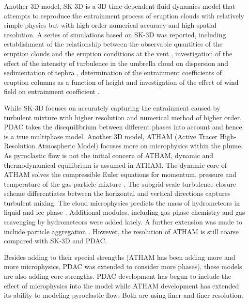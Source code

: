 \documentclass[journal abbreviation, manuscript]{copernicus}
\begin{document}
Another 3D model, SK-3D \citep{suzuki2005numerical} is a 3D time-dependent fluid dynamics model that attempts to reproduce the entrainment process of eruption clouds with relatively simple physics but with high order numerical accuracy and high spatial resolution.
A series of simulations based on SK-3D was reported, including establishment of the relationship between the observable quantities of the eruption clouds and the eruption conditions at the vent \citep{suzuki2009three}, investigation of the effect of the intensity of turbulence in the umbrella cloud on dispersion and sedimentation of tephra \citep{koyaguchi2009effect}, determination of the entrainment coefficients of eruption columns as a function of height \citep{suzuki2010numerical} and investigation of the effect of wind field on entrainment coefficient \citep{suzuki20133d}. 

While SK-3D focuses on accurately capturing the entrainment caused by turbulent mixture with higher resolution and numerical method of higher order, PDAC takes the disequilibrium between different phases into account and hence is a true multiphase model. Another 3D model, ATHAM (Active Tracer High-Resolution Atmospheric Model) \citep{oberhuber1998volcanic} focuses more on microphysics within the plume. As pyroclastic flow is not the initial concern of ATHAM, dynamic and thermodynamical equilibrium is assumed in ATHAM. The dynamic core of ATHAM solves the compressible Euler equations for momentum, pressure and temperature of the gas particle mixture \citep{oberhuber1998volcanic}. The subgrid-scale turbulence closure scheme differentiates between the horizontal and vertical directions \citep{herzog2003prognostic} captures turbulent mixing. The cloud microphysics predicts the mass of hydrometeors in liquid and ice phase \citep{herzog1998effect}. Additional modules, including gas phase chemistry \citep{trentmann2002simulation} and gas scavenging by hydrometeors \citep{textor2003injection} were added lately. A further extension was made to include particle aggregation \citep{textor2006volcanic1, textor2006volcanic2}. However, the resolution of ATHAM is still coarse compared with SK-3D and PDAC.

Besides adding to their special strengths (ATHAM has been adding more and more microphysics, PDAC was extended to consider more phases), these models are also adding core strengths. PDAC development has begun to include the effect of microphysics into the model while ATHAM development has extended its ability to modeling pyroclastic flow. Both are using finer and finer resolution. 
\end{document}
